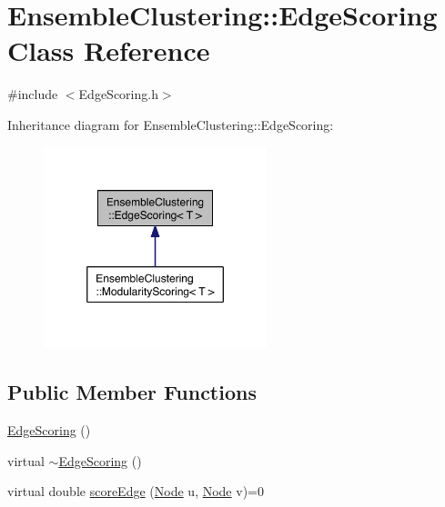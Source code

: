 \hypertarget{class_ensemble_clustering_1_1_edge_scoring}{\section{Ensemble\-Clustering\-:\-:Edge\-Scoring Class Reference}
\label{class_ensemble_clustering_1_1_edge_scoring}
}


{\ttfamily \#include $<$Edge\-Scoring.\-h$>$}



Inheritance diagram for Ensemble\-Clustering\-:\-:Edge\-Scoring\-:
\nopagebreak
\begin{figure}[H]
\begin{center}
\leavevmode
\includegraphics[width=184pt]{class_ensemble_clustering_1_1_edge_scoring__inherit__graph}
\end{center}
\end{figure}
\subsection*{Public Member Functions}
\begin{DoxyCompactItemize}
\item 
\hyperlink{class_ensemble_clustering_1_1_edge_scoring_a83339193ebf55255b09a34a2e1112eea}{Edge\-Scoring} ()
\item 
virtual \hyperlink{class_ensemble_clustering_1_1_edge_scoring_a1bb790ce6fd801ea40e0603785c73727}{$\sim$\-Edge\-Scoring} ()
\item 
virtual double \hyperlink{class_ensemble_clustering_1_1_edge_scoring_ae0b8ed83c76ea8f71f8246949d3106f4}{score\-Edge} (\hyperlink{namespace_ensemble_clustering_a136bcdc52fb2f62a89bc8bf8c1a7cb8f}{Node} u, \hyperlink{namespace_ensemble_clustering_a136bcdc52fb2f62a89bc8bf8c1a7cb8f}{Node} v)=0
\end{DoxyCompactItemize}


